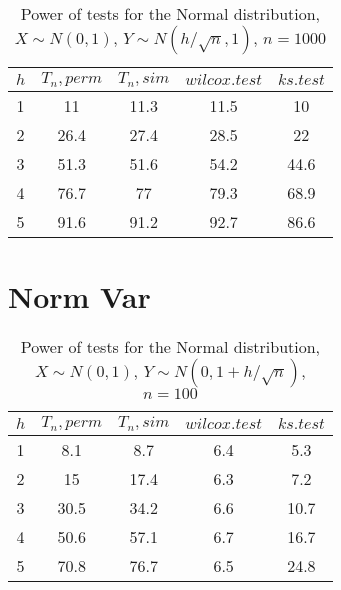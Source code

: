 \documentclass{svproc}
\begin{document}
\begin{table}
  \caption{Power of tests for the Normal distribution, $X\sim N(0,1)$, $Y\sim N(h/\sqrt{n},1)$, $n=1000$}
  \begin{center}
  \begin{tabular}{c@{\quad}c@{\quad}c@{\quad}c@{\quad}c}
  \hline
  $h$  & $T_n, perm$ & $T_n, sim$ & $wilcox.test$ & $ks.test$ \\
  \hline
  1 & 11 & 11.3 & 11.5 & 10 \\
  2 & 26.4 & 27.4 & 28.5 & 22 \\
  3 & 51.3 & 51.6 & 54.2 & 44.6 \\
  4 & 76.7 & 77 & 79.3 & 68.9 \\
  5 & 91.6 & 91.2 & 92.7 & 86.6 \\
  \hline
  \end{tabular}
  \end{center}
\end{table}

\newpage

\section*{Norm Var}

\begin{table}
  \caption{Power of tests for the Normal distribution, $X\sim N(0,1)$, $Y\sim N(0, 1 + h/\sqrt{n})$, $n=100$}
  \begin{center}
  \begin{tabular}{c@{\quad}c@{\quad}c@{\quad}c@{\quad}c}
  \hline
  $h$ & $T_n, perm$ & $T_n, sim$ & $wilcox.test$ & $ks.test$ \\
  \hline
  1 & 8.1 & 8.7 & 6.4 & 5.3 \\
  2 & 15 & 17.4 & 6.3 & 7.2 \\
  3 & 30.5 & 34.2 & 6.6 & 10.7 \\
  4 & 50.6 & 57.1 & 6.7 & 16.7 \\
  5 & 70.8 & 76.7 & 6.5 & 24.8 \\
  \hline
  \end{tabular}
  \end{center}
\end{table}
\end{document}
